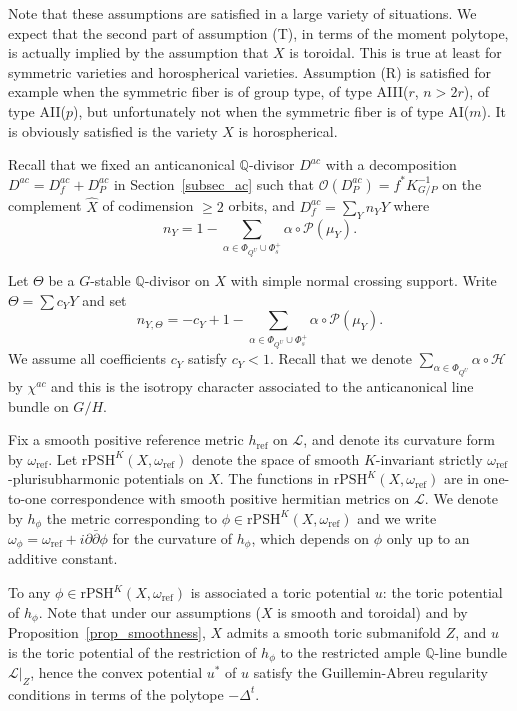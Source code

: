\documentclass{amsart}
\theoremstyle{definition}
\begin{document}
Note that these assumptions are satisfied in a large variety of situations. 
We expect that the second part of assumption (T), in terms of the moment 
polytope, is actually implied by the assumption that $X$ is toroidal. 
This is true at least for symmetric varieties and horospherical varieties.  
Assumption (R) is satisfied for example 
when the symmetric fiber is of group type, of 
type AIII($r$, $n>2r$), of type AII($p$), but unfortunately not 
when the symmetric fiber is of type AI($m$). It is obviously satisfied is 
the variety $X$ is horospherical. 

Recall that we fixed an anticanonical $\mathbb{Q}$-divisor
$D^{ac}$ with a decomposition $D^{ac}=D_f^{ac}+D_{P}^{ac}$ in 
Section~\ref{subsec_ac} such that 
$\mathcal{O}(D_{P}^{ac})=f^*K^{-1}_{G/P}$ on the complement $\hat{X}$ of 
codimension $\geq 2$ orbits, and 
$D_f^{ac}=\sum_Y n_Y Y$ 
where 
\[
n_Y=1-\sum_{\alpha\in\Phi_{Q^U}\cup \Phi_s^+}\alpha\circ \mathcal{P}(\mu_Y).
\]

Let $\Theta$ be a $G$-stable $\mathbb{Q}$-divisor on $X$ with 
simple normal crossing support. 
Write $\Theta=\sum c_YY$ and set
\[
n_{Y,\Theta}=-c_Y+1-\sum_{\alpha\in\Phi_{Q^U}\cup \Phi_s^+}\alpha\circ \mathcal{P}(\mu_Y).
\]
We assume all coefficients $c_Y$ satisfy $c_Y< 1$. 
Recall that we denote $\sum_{\alpha\in\Phi_{Q^U}}\alpha\circ \mathcal{H}$
by $\chi^{ac}$ and this is the isotropy character associated to the 
anticanonical line bundle on $G/H$.

Fix a smooth positive reference metric $h_{\mathrm{ref}}$ on $\mathcal{L}$, 
 and denote its curvature form by $\omega_{\mathrm{ref}}$. 
Let $\mathrm{rPSH}^K(X,\omega_{\mathrm{ref}})$ denote the space of  
smooth $K$-invariant strictly $\omega_{\mathrm{ref}}$-plurisubharmonic potentials on $X$.  
The functions in $\mathrm{rPSH}^K(X,\omega_{\mathrm{ref}})$ are in one-to-one 
correspondence with smooth positive hermitian metrics on $\mathcal{L}$. 
We denote by $h_{\phi}$ the metric 
corresponding to $\phi\in \mathrm{rPSH}^K(X,\omega_{\mathrm{ref}})$ and 
we write $\omega_{\phi}=\omega_{\mathrm{ref}} + i\partial \bar{\partial} \phi$
for the curvature of $h_{\phi}$, which depends on $\phi$ only up to 
an additive constant.

To any $\phi\in \mathrm{rPSH}^K(X,\omega_{\mathrm{ref}})$ is associated 
a toric potential $u$: the toric potential of $h_{\phi}$. Note that under our 
assumptions ($X$ is smooth and toroidal) and by Proposition~\ref{prop_smoothness}, 
$X$ admits a smooth toric 
submanifold $Z$, and $u$ is the toric potential of the restriction of 
$h_{\phi}$ to the restricted ample $\mathbb{Q}$-line bundle $\mathcal{L}|_Z$, 
hence the convex potential $u^*$ of $u$ satisfy the Guillemin-Abreu 
regularity conditions in terms of the polytope $-\Delta^t$.
\end{document}
